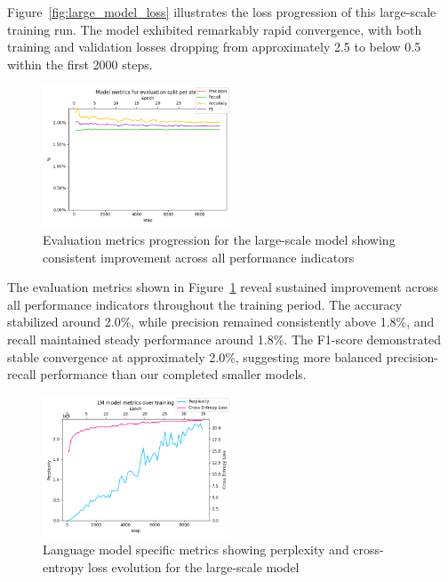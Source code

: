 \documentclass[../main.tex]{subfiles}
\begin{document}
Figure~\ref{fig:large_model_loss} illustrates the loss progression of this large-scale training run. The model exhibited remarkably rapid convergence, with both training and validation losses dropping from approximately 2.5 to below 0.5 within the first 2000 steps.

\begin{figure}[htbp]
\centering
\includegraphics[width=0.5\textwidth]{images/metrics_per_step.png}
\caption{Evaluation metrics progression for the large-scale model showing consistent improvement across all performance indicators}
\label{fig:large_model_metrics}
\end{figure}

The evaluation metrics shown in Figure~\ref{fig:large_model_metrics} reveal sustained improvement across all performance indicators throughout the training period. The accuracy stabilized around 2.0\%, while precision remained consistently above 1.8\%, and recall maintained steady performance around 1.8\%. The F1-score demonstrated stable convergence at approximately 2.0\%, suggesting more balanced precision-recall performance than our completed smaller models.

\begin{figure}[htbp]
\centering
\includegraphics[width=0.5\textwidth]{images/lm_metrics_per_step.png}
\caption{Language model specific metrics showing perplexity and cross-entropy loss evolution for the large-scale model}
\label{fig:large_model_lm}
\end{figure}
\end{document}
